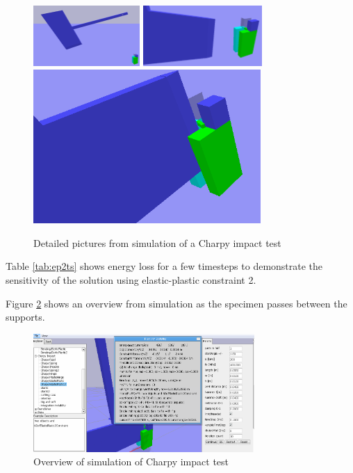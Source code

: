 \begin{figure}
\includegraphics[height=2.3cm]{figs/article-charpy-1}
\includegraphics[height=2.3cm]{figs/article-charpy-2}
\includegraphics[width=8.65cm]{figs/article-charpy-3}
\caption{Detailed pictures from simulation of a Charpy impact test}
\label{fig:charpy-series}
\end{figure}

Table \ref{tab:ep2ts} shows energy loss for a few timesteps to demonstrate the sensitivity of the solution
using  elastic-plastic constraint 2.

\begin {table}
\label{tab:ep2ts} 
\end {table}

Figure \ref{fig:charpy} shows an overview from simulation as the specimen passes between the supports.

\begin{figure}
\centering
\includegraphics[height=4.5cm]{figs/article-charpy}
\caption{Overview of simulation of Charpy impact test}
\label{fig:charpy}
\end{figure}



